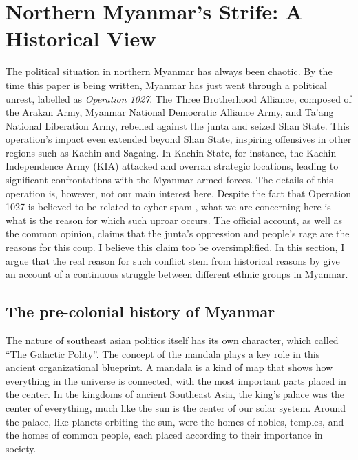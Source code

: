 \documentclass{article}
\begin{document}
\section{Northern Myanmar's Strife: A Historical View}

The political situation in northern Myanmar has always been chaotic. By the time this paper is being written, Myanmar has just went through a political unrest, labelled as \textit{Operation 1027}. The Three Brotherhood Alliance, composed of the Arakan Army, Myanmar National Democratic Alliance Army, and Ta’ang National Liberation Army, rebelled against the junta and seized Shan State.\autocite{yunsunOperation1027Changing2024} This operation's impact even extended beyond Shan State, inspiring offensives in other regions such as Kachin and Sagaing. In Kachin State, for instance, the Kachin Independence Army (KIA) attacked and overran strategic locations, leading to significant confrontations with the Myanmar armed forces. \autocite{theinternationalinstituteforstrategicstudiesOperation1027Reshapes2023} The details of this operation is, however, not our main interest here. Despite the fact that Operation 1027 is believed to be related to cyber spam , what we are concerning here is what is the reason for which such uproar occurs. The official account, as well as the common opinion, claims that the junta's oppression and people's rage are the reasons for this coup. \autocite{htetminlwinOperation1027End2023} I believe this claim too be oversimplified. In this section, I argue that the real reason for such conflict stem from historical reasons by give an account of a continuous struggle between different ethnic groups in Myanmar.

\subsection{The pre-colonial history of Myanmar}

The nature of southeast asian politics itself has its own character, which \textcite{tambiahGalacticPolity2007} called ``The Galactic Polity''. The concept of the mandala plays a key role in this ancient organizational blueprint. A mandala is a kind of map that shows how everything in the universe is connected, with the most important parts placed in the center. In the kingdoms of ancient Southeast Asia, the king's palace was the center of everything, much like the sun is the center of our solar system. Around the palace, like planets orbiting the sun, were the homes of nobles, temples, and the homes of common people, each placed according to their importance in society.~\autocite{tambiahGalacticPolity2007}
\end{document}
